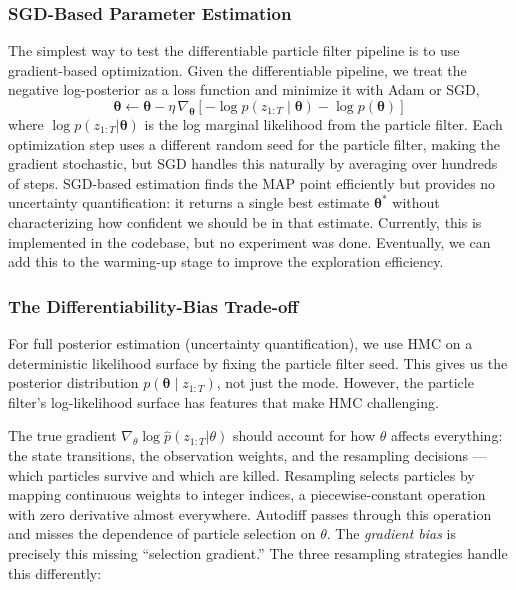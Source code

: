 \documentclass{article}
\renewcommand{\v}[1]{ \ensuremath{ {\mathbf{#1}} }}
\begin{document}
\subsubsection{SGD-Based Parameter Estimation}
The simplest way to test the differentiable particle filter pipeline is to use gradient-based optimization. Given the differentiable pipeline, we treat the negative log-posterior as a loss function and minimize it with Adam or SGD,
\begin{equation}
    \v \theta \leftarrow \v \theta - \eta \,\nabla_{\v \theta}\!\left[-\log p(z_{1:T} \mid \v\theta) - \log p(\v \theta)\right]
\end{equation}
where $\log p(z_{1:T}|\v\theta)$ is the log marginal likelihood from the particle filter. Each optimization step uses a different random seed for the particle filter, making the gradient stochastic, but SGD handles this naturally by averaging over hundreds of steps. SGD-based estimation finds the MAP point efficiently but provides no uncertainty quantification: it returns a single best estimate $\v\theta^*$ without characterizing how confident we should be in that estimate. Currently, this is implemented in the codebase, but no experiment was done. Eventually, we can add this to the warming-up stage to improve the exploration efficiency.


\subsubsection{The Differentiability-Bias Trade-off}
For full posterior estimation (uncertainty quantification), we use HMC on a deterministic likelihood surface by fixing the particle filter seed. This gives us the posterior distribution $p(\v \theta \mid z_{1:T})$, not just the mode. However, the particle filter's log-likelihood surface has features that make HMC challenging.

The true gradient $\nabla_\theta \log \hat{p}(z_{1:T}|\theta)$ should account for how $\theta$ affects everything: the state transitions, the observation weights, and the resampling decisions --- which particles survive and which are killed. Resampling selects particles by mapping continuous weights to integer indices, a piecewise-constant operation with zero derivative almost everywhere. Autodiff passes through this operation and misses the dependence of particle selection on $\theta$. The \textit{gradient bias} is precisely this missing ``selection gradient.'' The three resampling strategies handle this differently:
\end{document}

